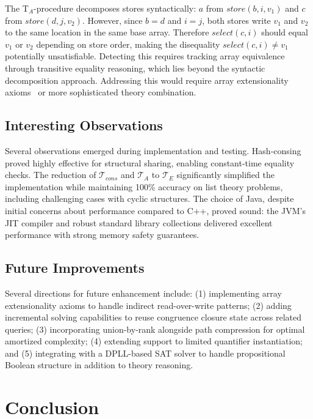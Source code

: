 \documentclass[11pt,a4paper]{article}
\begin{document}
The T$_A$-procedure decomposes stores syntactically: $a$ from $store(b,i,v_1)$ and $c$ from $store(d,j,v_2)$. However, since $b = d$ and $i = j$, both stores write $v_1$ and $v_2$ to the same location in the same base array. Therefore $select(c,i)$ should equal $v_1$ or $v_2$ depending on store order, making the disequality $select(c,i) \neq v_1$ potentially unsatisfiable. Detecting this requires tracking array equivalence through transitive equality reasoning, which lies beyond the syntactic decomposition approach. Addressing this would require array extensionality axioms~\cite{stump2001decision} or more sophisticated theory combination.

\subsection{Interesting Observations}

Several observations emerged during implementation and testing. Hash-consing proved highly effective for structural sharing, enabling constant-time equality checks. The reduction of $\mathcal{T}_{cons}$ and $\mathcal{T}_A$ to $\mathcal{T}_E$ significantly simplified the implementation while maintaining 100\% accuracy on list theory problems, including challenging cases with cyclic structures. The choice of Java, despite initial concerns about performance compared to C++, proved sound: the JVM's JIT compiler and robust standard library collections delivered excellent performance with strong memory safety guarantees.

\subsection{Future Improvements}

Several directions for future enhancement include: (1) implementing array extensionality axioms to handle indirect read-over-write patterns; (2) adding incremental solving capabilities to reuse congruence closure state across related queries; (3) incorporating union-by-rank alongside path compression for optimal amortized complexity; (4) extending support to limited quantifier instantiation; and (5) integrating with a DPLL-based SAT solver to handle propositional Boolean structure in addition to theory reasoning.

\section{Conclusion}
\end{document}
